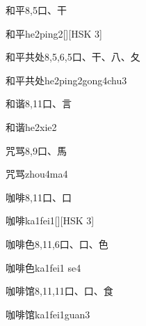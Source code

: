 \begin{entry}{和平}{8,5}{⼝、⼲}
  \begin{phonetics}{和平}{he2ping2}[][HSK 3]
  \end{phonetics}
\end{entry}

\begin{entry}{和平共处}{8,5,6,5}{⼝、⼲、⼋、⼡}
  \begin{phonetics}{和平共处}{he2ping2gong4chu3}
  \end{phonetics}
\end{entry}

\begin{entry}{和谐}{8,11}{⼝、⾔}
  \begin{phonetics}{和谐}{he2xie2}
  \end{phonetics}
\end{entry}

\begin{entry}{咒骂}{8,9}{⼝、⾺}
  \begin{phonetics}{咒骂}{zhou4ma4}
  \end{phonetics}
\end{entry}

\begin{entry}{咖啡}{8,11}{⼝、⼝}
  \begin{phonetics}{咖啡}{ka1fei1}[][HSK 3]
  \end{phonetics}
\end{entry}

\begin{entry}{咖啡色}{8,11,6}{⼝、⼝、⾊}
  \begin{phonetics}{咖啡色}{ka1fei1 se4}
  \end{phonetics}
\end{entry}

\begin{entry}{咖啡馆}{8,11,11}{⼝、⼝、⾷}
  \begin{phonetics}{咖啡馆}{ka1fei1guan3}
  \end{phonetics}
\end{entry}

